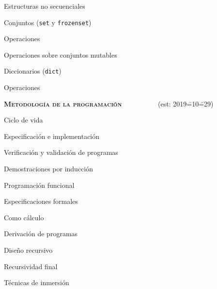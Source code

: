 \begin{longenum}
\begin{longenum}
\begin{longenum}
        \end{longenum}
        \item Estructuras no secuenciales
        \begin{longenum}
            \item Conjuntos (\texttt{set} y \texttt{frozenset})
            \begin{longenum}
                \item Operaciones
                \item Operaciones sobre conjuntos mutables
            \end{longenum}
            \item Diccionarios (\texttt{dict})
            \begin{longenum}
                \item Operaciones
            \end{longenum}
        \end{longenum}
    \end{longenum}
    \item \textbf{\textsc{Metodología de la programación}} \ \ \ \ \ \ \opcional\ \ \ \ (est: 2019\==10\==29)
    \begin{longenum}
        \item Ciclo de vida
        \item Especificación e implementación
        \item Verificación y validación de programas
        \begin{longenum}
            \item Demostraciones por inducción
        \end{longenum}
        \item Programación funcional
        \begin{longenum}
            \item Especificaciones formales
            \begin{longenum}
                \item Como cálculo
            \end{longenum}
            \item Derivación de programas
            \begin{longenum}
                \item Diseño recursivo
                \begin{longenum}
                    \item Recursividad final
                    \item Técnicas de inmersión \opcional\

\end{longenum}
\end{longenum}
\end{longenum}
\end{longenum}
\end{longenum}
